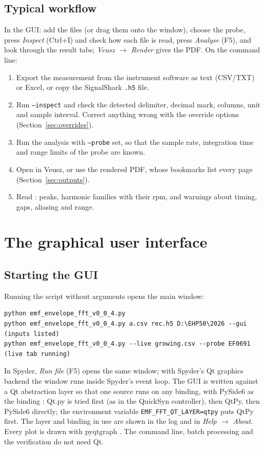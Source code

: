 \documentclass[10pt,letterpaper]{article}
\numberwithin{equation}{section}
\begin{document}
\subsection{Typical workflow}
In the GUI: add the files (or drag them onto the window), choose the probe,
press \emph{Inspect} (Ctrl+I) and check how each file is read, press
\emph{Analyse} (F5), and look through the result tabs; \emph{Veusz $\rightarrow$
Render} gives the PDF. On the command line:
\begin{enumerate}
\item Export the measurement from the instrument software as text (CSV/TXT) or
Excel, or copy the SignalShark \texttt{.h5} file.
\item Run \texttt{--inspect} and check the detected delimiter, decimal mark,
columns, unit and sample interval. Correct anything wrong with the override
options (Section~\ref{sec:overrides}).
\item Run the analysis with \texttt{--probe} set, so that the sample rate,
integration time and range limits of the probe are known.
\item Open  in Veusz, or use the rendered PDF,
whose bookmarks list every page (Section~\ref{sec:outputs}).
\item Read : peaks, harmonic families with their rpm,
and warnings about timing, gaps, aliasing and range.
\end{enumerate}

\section{The graphical user interface}\label{sec:gui}

\subsection{Starting the GUI}
Running the script without arguments opens the main window:
\begin{Verbatim}
python emf_envelope_fft_v0_0_4.py
python emf_envelope_fft_v0_0_4.py a.csv rec.h5 D:\EHP50\2026 --gui    (inputs listed)
python emf_envelope_fft_v0_0_4.py --live growing.csv --probe EF0691   (live tab running)
\end{Verbatim}
In Spyder, \emph{Run file} (F5) opens the same window; with Spyder's Qt graphics
backend the window runs inside Spyder's event loop. The GUI is written against a
Qt abstraction layer so that one source runs on any binding, with PySide6 as the
binding \cite{B24,B40,B25}: Qt.py is tried first (as in the QuickSyn controller),
then QtPy, then PySide6 directly; the environment variable
\texttt{EMF\_FFT\_QT\_LAYER=qtpy} puts QtPy first. The layer and binding in use are
shown in the log and in \emph{Help $\rightarrow$ About}. Every plot is drawn with
pyqtgraph \cite{B26}. The command line, batch processing and the verification do
not need Qt.
\end{document}
